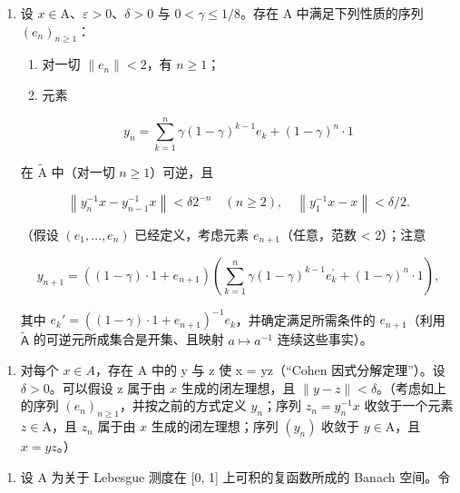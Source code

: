 \begin{enumerate}
\def\labelenumi{\alph{enumi})}
\setcounter{enumi}{3}
\tightlist
\item
  设 \(x \in \mathrm{A}\)、\(\varepsilon > 0\)、\(\delta > 0\) 与 \(0 < \gamma \leqslant 1/8\)。存在 A 中满足下列性质的序列 \((e_n)_{n \geqslant 1}\)：

\begin{enumerate}
\def\labelenumi{(\roman{enumi})}
\item
  对一切 \(\|e_{n}\| < 2\)，有 \(n \geqslant 1\)；
\item
  元素
\end{enumerate}

\[
y _ {n} = \sum_ {k = 1} ^ {n} \gamma (1 - \gamma) ^ {k - 1} e _ {k} + (1 - \gamma) ^ {n} \cdot 1
\]

在 \(\widetilde{\mathrm{A}}\) 中（对一切 \(n\geqslant 1\)）可逆，且

\[
\left\| y _ {n} ^ {- 1} x - y _ {n - 1} ^ {- 1} x \right\| <   \delta 2 ^ {- n} \quad (n \geqslant 2), \quad \left\| y _ {1} ^ {- 1} x - x \right\| <   \delta / 2.
\]

（假设 \((e_{1},\ldots,e_{n})\) 已经定义，考虑元素 \(e_{n+1}\)（任意，范数 \textless{} 2）；注意

\[
y _ {n + 1} = ((1 - \gamma) \cdot 1 + e _ {n + 1}) \left(\sum_ {k = 1} ^ {n} \gamma (1 - \gamma) ^ {k - 1} e _ {k} ^ {\prime} + (1 - \gamma) ^ {n} \cdot 1\right),
\]

其中 \(e_k' = ((1 - \gamma) \cdot 1 + e_{n+1})^{-1} e_k\)，并确定满足所需条件的 \(e_{n+1}\)（利用 \(\widetilde{\mathsf{A}}\) 的可逆元所成集合是开集、且映射 \(a \mapsto a^{-1}\) 连续这些事实）。
\end{enumerate}

\begin{enumerate}
\def\labelenumi{\alph{enumi})}
\setcounter{enumi}{4}
\tightlist
\item
  对每个 \(x \in A\)，存在 A 中的 y 与 z 使 x = yz（“Cohen 因式分解定理”）。设 \(\delta > 0\)。可以假设 z 属于由 \(x\) 生成的闭左理想，且 \(\|y-z\|<\delta\)。（考虑如上的序列 \((e_{n})_{n\geqslant1}\)，并按之前的方式定义 \(y_{n}\)；序列 \(z_{n}=y_{n}^{-1}x\) 收敛于一个元素 \(z\in\mathrm{A}\)，且 \(z_{n}\) 属于由 \(x\) 生成的闭左理想；序列 \((y_{n})\) 收敛于 \(y\in\mathrm{A}\)，且 \(x=yz\)。）
\end{enumerate}

\begin{enumerate}
\def\labelenumi{\arabic{enumi})}
\setcounter{enumi}{30}
\tightlist
\item
  设 A 为关于 Lebesgue 测度在 {[}0, 1{]} 上可积的复函数所成的 Banach 空间。令
\end{enumerate}

